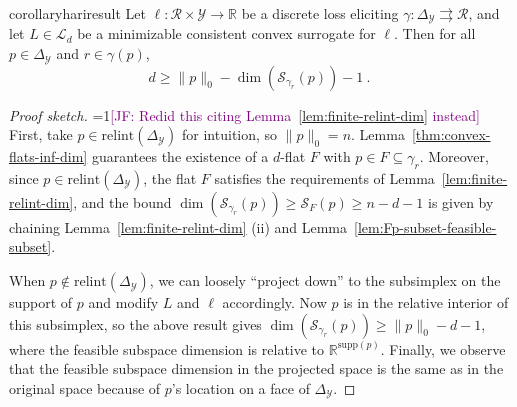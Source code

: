 \documentclass[anon,12pt]{colt2021} %
\newcommand{\Comments}{1}
\newcommand{\mynote}[2]{\ifnum\Comments=1\textcolor{#1}{#2}\fi}
\newcommand{\mytodo}[2]{\ifnum\Comments=1%
	\todo[linecolor=#1!80!black,backgroundcolor=#1,bordercolor=#1!80!black]{#2}\fi}
\newcommand{\jessie}[1]{\mynote{purple}{[JF: #1]}}
\newcommand{\jessiet}[1]{\mytodo{purple!20!white}{JF: #1}}
\newcommand{\bo}[1]{\mynote{blue}{[Bo: #1]}}
\newcommand{\btw}[1]{\mytodo{orange!80!white}{BTW: #1}}
\newcommand{\reals}{\mathbb{R}}
\newcommand{\simplex}{\Delta_\Y}
\newcommand{\relint}[1]{\mathrm{relint}(#1)}
\newcommand{\ccdim}{\mathrm{cc\,dim}}
\newcommand{\supp}{\mathrm{supp}}
\newcommand{\codim}{\mathrm{codim}}
\renewcommand{\L}{\mathcal{L}}
\newcommand{\R}{\mathcal{R}}
\newcommand{\Sc}{\mathcal{S}}  %
\newcommand{\Scr}{\mathcal{S}}  %
\newcommand{\Y}{\mathcal{Y}}
\newcommand{\toto}{\rightrightarrows}
\begin{document}
\begin{restatable}{corollary}{hariresult}\label{cor:fsd-bound}
	Let $\ell:\R \times \Y \to \reals$ be a discrete loss eliciting $\gamma:\simplex \toto \R$, and let $L \in \L_d$ be a minimizable consistent convex surrogate for $\ell$.
	Then for all $p \in \simplex$ and $r \in \gamma(p)$,
	\begin{equation}
	  d \geq \|p\|_0 - \dim(\Sc_{\gamma_r}(p)) - 1~.~
	\end{equation}
\end{restatable}
\begin{proof}[Proof sketch]
	\jessie{Redid this citing Lemma~\ref{lem:finite-relint-dim} instead}
	First, take $p \in \relint{\simplex}$ for intuition, so $\|p\|_0 = n$.
	Lemma~\ref{thm:convex-flats-inf-dim} guarantees the existence of a $d$-flat $F$ with $p \in F \subseteq \gamma_r$.
	Moreover, since $p \in \relint{\simplex}$, the flat $F$ satisfies the requirements of Lemma~\ref{lem:finite-relint-dim}, and the bound $\dim(\Sc_{\gamma_r}(p)) \geq \Scr_F(p) \geq n - d- 1$ is given by chaining Lemma~\ref{lem:finite-relint-dim} (ii) and Lemma~\ref{lem:Fp-subset-feasible-subset}.

	When $p \not \in \relint{\simplex}$, we can loosely ``project down'' to the subsimplex on the support of $p$ and modify $L$ and $\ell$ accordingly.
	Now $p$ is in the relative interior of this subsimplex, so the above result gives $\dim(\Sc_{\gamma_r}(p)) \geq \|p\|_0 - d - 1$, where the feasible subspace dimension is relative to $\reals^{\supp(p)}$.
	Finally, we observe that the feasible subspace dimension in the projected space is the same as in the original space because of $p$'s location on a face of $\simplex$.
\end{proof}
\end{document}
